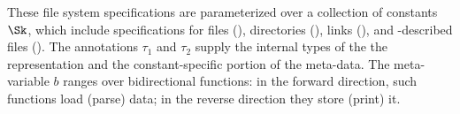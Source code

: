 
These file system specifications are parameterized over a collection
of constants $\Sk$, which include specifications for files (\pfile),
directories (\pdir), links (\plink), and \padshaskell{}-described
files (). The annotations $\tau_1$ and $\tau_2$ supply the
internal types of the the representation and the constant-specific
portion of the meta-data. The meta-variable $b$ ranges over
bidirectional functions: in the forward direction, such functions load
(parse) data; in the reverse direction they store (print) it.

